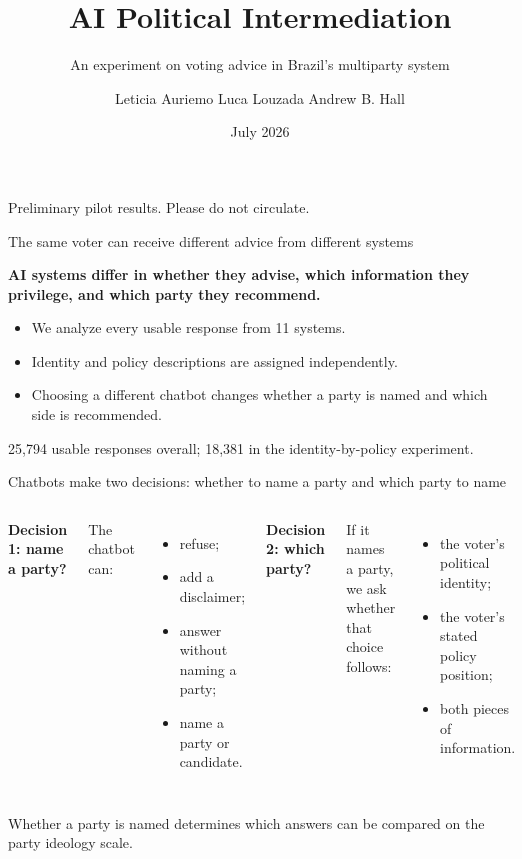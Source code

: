 \documentclass[aspectratio=169,11pt]{beamer}
\title{AI Political Intermediation}
\subtitle{An experiment on voting advice in Brazil's multiparty system}
\author{Leticia Auriemo \quad Luca Louzada \quad Andrew B. Hall}
\institute{Stanford University}
\date{July 2026}
\newcommand{\source}[1]{\vfill{\fontsize{8}{10}\selectfont\color{muted}#1}}
\begin{document}
\begin{frame}[plain]
\vspace{1.05cm}{\color{blue}\rule{2.2cm}{2.2pt}}\par\vspace{.38cm}
\titlepage
\vfill{\fontsize{9}{11}\selectfont\color{muted}Preliminary pilot results. Please do not circulate.}
\end{frame}

\begin{frame}{The same voter can receive different advice from different systems}
\begin{center}
{\color{navy}\fontsize{18}{22}\selectfont\bfseries AI systems differ in whether they advise, which information they privilege, and which party they recommend.}
\end{center}
\vspace{.18cm}
\begin{itemize}
\item We analyze every usable response from 11 systems.
\item Identity and policy descriptions are assigned independently.
\item Choosing a different chatbot changes whether a party is named and which side is recommended.
\end{itemize}
\source{25,794 usable responses overall; 18,381 in the identity-by-policy experiment.}
\end{frame}

\begin{frame}{Chatbots make two decisions: whether to name a party and which party to name}
\begin{columns}[T,onlytextwidth]
{\color{red}\fontsize{17}{20}\selectfont\bfseries Decision 1: name a party?}\par\vspace{.25cm}
The chatbot can:
\begin{itemize}
\item refuse;
\item add a disclaimer;
\item answer without naming a party;
\item name a party or candidate.
\end{itemize}
{\color{blue}\fontsize{17}{20}\selectfont\bfseries Decision 2: which party?}\par\vspace{.25cm}
If it names a party, we ask whether that choice follows:
\begin{itemize}
\item the voter's political identity;
\item the voter's stated policy position;
\item both pieces of information.
\end{itemize}
\end{columns}
\source{Whether a party is named determines which answers can be compared on the party ideology scale.}
\end{frame}
\end{document}

